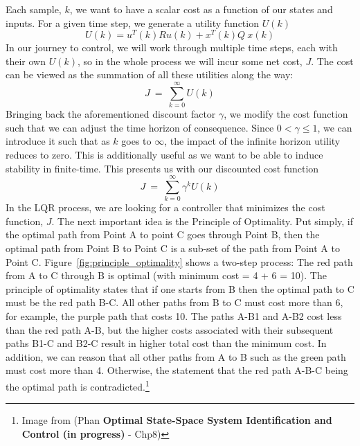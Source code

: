 Each sample, $k$, we want to have a scalar cost as a function of our states and inputs. For a given time step, we generate a utility function $U\left(k\right)$
\begin{equation}
    U\left(k\right)=u^T\left(k\right)Ru\left(k\right)+x^T\left(k\right)Q\ x\left(k\right)
    \label{eq:utility_function}
\end{equation}
In our journey to control, we will work through multiple time steps, each with their own $U\left(k\right)$, so in the whole process we will incur some net cost, $J$. The cost can be viewed as the summation of all these utilities along the way:
\begin{equation}
    J\ =\ \sum_{k=0}^{\infty}U\left(k\right)
    \label{eq:cost_function}
\end{equation}
Bringing back the aforementioned discount factor $\gamma$, we modify the cost function such that we can adjust the time horizon of consequence. Since $0<\gamma \le 1$, we can introduce it such that as $k$ goes to $\infty$, the impact of the infinite horizon utility reduces to zero. This is additionally useful as we want to be able to induce stability in finite-time. This presents us with our discounted cost function
\begin{equation}
    J\ =\ \sum_{k=0}^{\infty}{\gamma ^k U\left(k\right)}
    \label{eq:discounted_cost_function}
\end{equation}
In the LQR process, we are looking for a controller that minimizes the cost function, $J$.
The next important idea is the Principle of Optimality. Put simply, if the optimal path from Point A to point C goes through Point B, then the optimal path from Point B to Point C is a sub-set of the path from Point A to Point C. Figure~\ref{fig:principle_optimality} shows a two-step process: The red path from A to C through B is optimal (with minimum cost = 4 + 6 = 10). The principle of optimality states that if one starts from B then the optimal path to C must be the red path B-C. All other paths from B to C must cost more than 6, for example, the purple path that costs 10. The paths A-B1 and A-B2 cost less than the red path A-B, but the higher costs associated with their subsequent paths B1-C and B2-C result in higher total cost than the minimum cost. In addition, we can reason that all other paths from A to B such as the green path must cost more than 4. Otherwise, the statement that the red path A-B-C being the optimal path is contradicted.\footnote{Image from (Phan \textbf{Optimal State-Space System Identification and Control (in progress)} - Chp8)}
